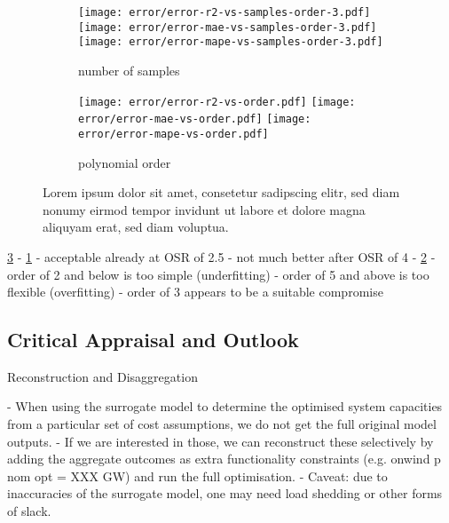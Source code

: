 \begin{figure}
    \begin{subfigure}[t]{\textwidth}
        \caption{number of samples}
        \label{fig:error:samples}
        \texttt{[image: error/error-r2-vs-samples-order-3.pdf]}
        \texttt{[image: error/error-mae-vs-samples-order-3.pdf]}
        \texttt{[image: error/error-mape-vs-samples-order-3.pdf]}
    \end{subfigure}
    \begin{subfigure}[t]{\textwidth}
        \caption{polynomial order}
        \label{fig:error:poly}
        \texttt{[image: error/error-r2-vs-order.pdf]}
        \texttt{[image: error/error-mae-vs-order.pdf]}
        \texttt{[image: error/error-mape-vs-order.pdf]}
    \end{subfigure}
    \caption{Lorem ipsum dolor sit amet, consetetur sadipscing elitr, sed diam nonumy eirmod tempor invidunt ut labore et dolore magna aliquyam erat, sed diam voluptua.}
    \label{fig:error}
\end{figure}

\cref{fig:error}
- \cref{fig:error:samples}
  - acceptable already at OSR of 2.5
  - not much better after OSR of 4
- \cref{fig:error:poly}
  - order of 2 and below is too simple (underfitting)
  - order of 5 and above is too flexible (overfitting)
  - order of 3 appears to be a suitable compromise


\subsection{Critical Appraisal and Outlook}

Reconstruction and Disaggregation

- When using the surrogate model to determine the optimised system capacities
from a particular set of cost assumptions, we do not get the full original model outputs.
- If we are interested in those, we can reconstruct these selectively
by adding the aggregate outcomes as extra  functionality constraints (e.g. onwind p nom opt = XXX GW) and run the full optimisation.
- Caveat: due to inaccuracies  of the surrogate model, one may need load shedding or other forms of slack.


